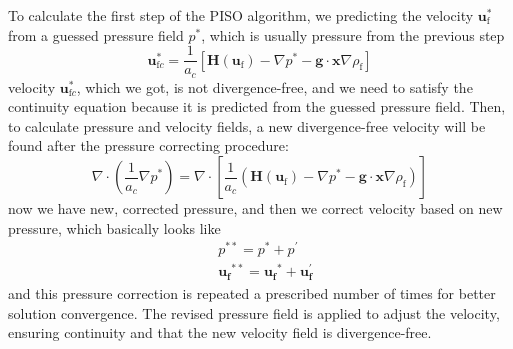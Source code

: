 To calculate the first step of the PISO algorithm, we predicting the velocity $\mathbf{u}_{\mathrm{f}}^*$ from a guessed pressure field $p^*$, which is usually pressure from the previous step
\begin{equation}
\boldsymbol{u}^*_{\mathrm{f} c}=\frac{1}{a_c}\left[\mathbf{H}\left(\boldsymbol{u}_{\mathrm{f}}\right)-\nabla p^*-\boldsymbol{g} \cdot \boldsymbol{x} \nabla \rho_{\mathrm{f}}\right]
\end{equation}
velocity $\boldsymbol{u}^*_{\mathrm{f} c}$, which we got, is not divergence-free, and we need to satisfy the continuity equation because it is predicted from the guessed pressure field. Then, to calculate pressure and velocity fields, a new divergence-free velocity will be found after the pressure correcting procedure:
\begin{equation}
\nabla \cdot\left(\frac{1}{a_c} \nabla p^*\right)=\nabla \cdot\left[\frac{1}{a_c}\left(\mathbf{H}\left(\boldsymbol{u}_{\mathrm{f}}\right)-\nabla p^*-\boldsymbol{g} \cdot \boldsymbol{x} \nabla \rho_{\mathrm{f}}\right)\right]
\end{equation}
now we have new, corrected pressure, and then we correct velocity based on new pressure, which basically looks like
\begin{equation}
\begin{aligned}
&p^{* *}=p^*+p^{\prime}\\
&\mathbf{u}_{\mathbf{f}}{ }^{* *}=\mathbf{u}_{\mathbf{f}}{ }^*+\mathbf{u}_{\mathbf{f}}^{\prime}
\end{aligned}
\end{equation}
and this pressure correction is repeated a prescribed number of times for better solution convergence. The revised pressure field is applied to adjust the velocity, ensuring continuity and that the new velocity field is divergence-free.



